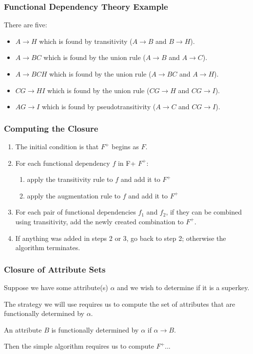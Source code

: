 \begin{frame}
\frametitle{Functional Dependency Theory Example}

There are five:
\begin{itemize}
	\item $A \rightarrow H$ which is found by transitivity ($A \rightarrow B$ and $B \rightarrow H$).
	\item $A \rightarrow BC$ which is found by the union rule ($A \rightarrow B$ and $A \rightarrow C$).
	\item $A \rightarrow BCH$ which is found by the union rule ($A \rightarrow BC$ and $A \rightarrow H$).
	\item $CG \rightarrow HI$ which is found by the union rule ($CG \rightarrow H$ and $CG \rightarrow I$).
	\item $AG \rightarrow I$ which is found by pseudotransitivity ($A \rightarrow C$ and $CG \rightarrow I$).
\end{itemize}


\end{frame}



\begin{frame}
\frametitle{Computing the Closure}

\begin{enumerate}
	\item The initial condition is that $F^{+}$ begins as $F$.
	\item For each functional dependency $f$ in F+ $F^{+}$:
	\begin{enumerate}
		\item apply the transitivity rule to $f$ and add it to $F^{+}$
		\item apply the augmentation rule to $f$ and add it to $F^{+}$
	\end{enumerate}
	\item For each pair of functional dependencies $f_{1}$ and $f_{2}$, if they can be combined using transitivity, add the newly created combination to $F^{+}$.
	\item If anything was added in steps 2 or 3, go back to step 2; otherwise the algorithm terminates.
\end{enumerate}

\end{frame}



\begin{frame}
\frametitle{Closure of Attribute Sets}

Suppose we have some attribute(s) $\alpha$ and we wish to determine if it is a superkey. 

The strategy we will use requires us to compute the set of attributes that are \alert{functionally determined} by $\alpha$. 

An attribute $B$ is functionally determined by $\alpha$ if $\alpha \rightarrow B$. 

Then the simple algorithm requires us to compute $F^{+}$...

\end{frame}



